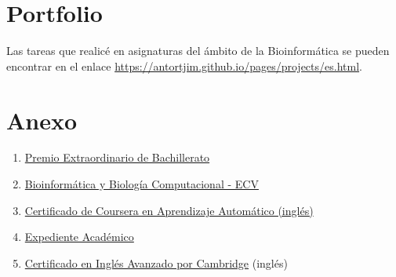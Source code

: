 \documentclass[paper=a4,fontsize=11pt]{article} %
\newcommand{\NewPart}[1]{\section*{
									{#1}}}
\begin{document}
\NewPart{Portfolio}

Las tareas que realicé en asignaturas del ámbito de la Bioinformática se pueden encontrar en el enlace \href{https://antortjim.github.io/pages/projects/es.html}{https://antortjim.github.io/pages/projects/es.html}.



\NewPart{Anexo}
\begin{enumerate}


\item \hyperlink{premio_extraordinario}{Premio Extraordinario de Bachillerato}
\item \hyperlink{complu}{Bioinformática y Biología Computacional - ECV}

\item \hyperlink{ML-Coursera}{Certificado de Coursera en Aprendizaje Automático (inglés)}

\item \hyperlink{exp-en}{Expediente Académico}
\item \hyperlink{cae}{Certificado en Inglés Avanzado por Cambridge} (inglés)
\end{enumerate}
%



\end{document}
